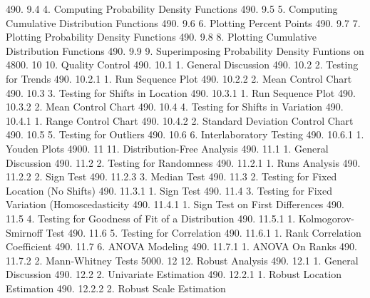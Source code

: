 490.      9.4                   4. Computing Probability Density Functions
490.      9.5                   5. Computing Cumulative Distribution Functions
490.      9.6                   6. Plotting Percent Points
490.      9.7                   7. Plotting Probability Density Functions
490.      9.8                   8. Plotting Cumulative Distribution Functions
490.      9.9                   9. Superimposing Probability Density Funtions on
4800.     10             10. Quality Control
490.      10.1                  1. General Discussion
490.      10.2                  2. Testing for Trends
490.      10.2.1                      1. Run Sequence Plot
490.      10.2.2                      2. Mean Control Chart
490.      10.3                  3. Testing for Shifts in Location
490.      10.3.1                      1. Run Sequence Plot
490.      10.3.2                      2. Mean Control Chart
490.      10.4                  4. Testing for Shifts in Variation
490.      10.4.1                      1. Range Control Chart
490.      10.4.2                      2. Standard Deviation Control Chart
490.      10.5                  5. Testing for Outliers
490.      10.6                  6. Interlaboratory Testing
490.      10.6.1                      1. Youden Plots
4900.     11             11. Distribution-Free Analysis
490.      11.1                  1. General Discussion
490.      11.2                  2. Testing for Randomness
490.      11.2.1                      1. Runs Analysis
490.      11.2.2                      2. Sign Test
490.      11.2.3                      3. Median Test
490.      11.3                  2. Testing for Fixed Location (No Shifts)
490.      11.3.1                      1. Sign Test
490.      11.4                  3. Testing for Fixed Variation (Homoscedasticity
490.      11.4.1                      1. Sign Test on First Differences
490.      11.5                  4. Testing for Goodness of Fit of a Distribution
490.      11.5.1                      1. Kolmogorov-Smirnoff Test
490.      11.6                  5. Testing for Correlation
490.      11.6.1                      1. Rank Correlation Coefficient
490.      11.7                  6. ANOVA Modeling
490.      11.7.1                      1. ANOVA On Ranks
490.      11.7.2                      2. Mann-Whitney Tests
5000.     12             12. Robust Analysis
490.      12.1                  1. General Discussion
490.      12.2                  2. Univariate Estimation
490.      12.2.1                      1. Robust Location Estimation
490.      12.2.2                      2. Robust Scale Estimation
